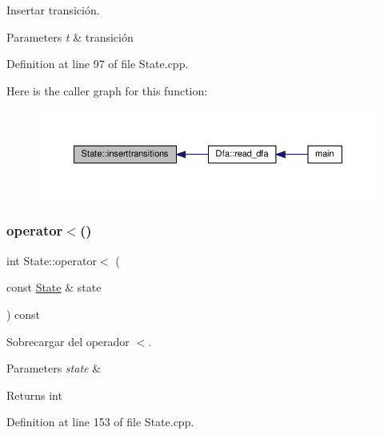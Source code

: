 Insertar transición. 


\begin{DoxyParams}{Parameters}
{\em t} & transición \\
\hline
\end{DoxyParams}


Definition at line 97 of file State.\+cpp.

Here is the caller graph for this function\+:
\nopagebreak
\begin{figure}[H]
\begin{center}
\leavevmode
\includegraphics[width=350pt]{class_state_af93c774d8cbb27b81f2c86a0036f32d2_icgraph}
\end{center}
\end{figure}
\mbox{\label{class_state_a7771d67d4ef98c2fd8ab7924e757781c}} 
\subsubsection{\texorpdfstring{operator$<$()}{operator<()}}
{\footnotesize\ttfamily int State\+::operator$<$ (\begin{DoxyParamCaption}\item[{const \hyperlink{class_state}{State} \&}]{state }\end{DoxyParamCaption}) const}



Sobrecargar del operador $<$. 


\begin{DoxyParams}{Parameters}
{\em state} & \\
\hline
\end{DoxyParams}
\begin{DoxyReturn}{Returns}
int 
\end{DoxyReturn}


Definition at line 153 of file State.\+cpp.

\mbox{\label{class_state_a520af8c9479e6832b07612907b2c8108}} 
